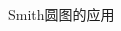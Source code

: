 \begin{frame}{Smith圆图的应用}
\begin{columns}
\begin{column}{0.6\linewidth}
    \end{column}
  \end{columns}
\end{frame}


